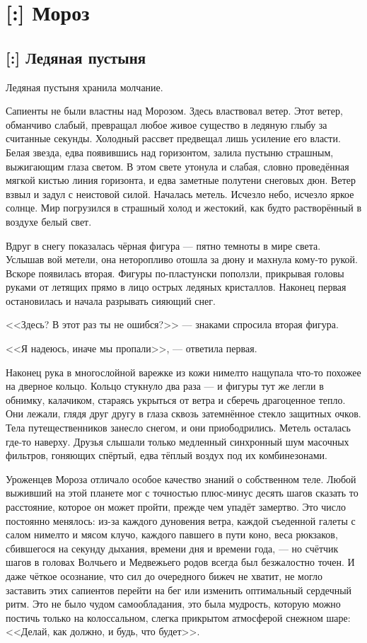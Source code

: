\chapter{[:] Мороз}

\section{[:] Ледяная пустыня}

Ледяная пустыня хранила молчание.

Сапиенты не были властны над Морозом.
Здесь властвовал ветер.
Этот ветер, обманчиво слабый, превращал любое живое существо в ледяную глыбу за считанные секунды.
Холодный рассвет предвещал лишь усиление его власти.
Белая звезда, едва появившись над горизонтом, залила пустыню страшным, выжигающим глаза светом.
В этом свете утонула и слабая, словно проведённая мягкой кистью линия горизонта, и едва заметные полутени снеговых дюн.
Ветер взвыл и задул с неистовой силой.
Началась метель.
Исчезло небо, исчезло яркое солнце.
Мир погрузился в страшный холод и жестокий, как будто растворённый в воздухе белый свет.

Вдруг в снегу показалась чёрная фигура --- пятно темноты в мире света.
Услышав вой метели, она неторопливо отошла за дюну и махнула кому-то рукой.
Вскоре появилась вторая.
Фигуры по-пластунски поползли, прикрывая головы руками от летящих прямо в лицо острых ледяных кристаллов.
Наконец первая остановилась и начала разрывать сияющий снег.

<<Здесь? В этот раз ты не ошибся?>> --- знаками спросила вторая фигура.

<<Я надеюсь, иначе мы пропали>>, --- ответила первая.

Наконец рука в многослойной варежке из кожи нимелто нащупала что-то похожее на дверное кольцо.
Кольцо стукнуло два раза --- и фигуры тут же легли в обнимку, калачиком, стараясь укрыться от ветра и сберечь драгоценное тепло.
Они лежали, глядя друг другу в глаза сквозь затемнённое стекло защитных очков.
Тела путещественников занесло снегом, и они приободрились.
Метель осталась где-то наверху.
Друзья слышали только медленный синхронный шум масочных фильтров, гоняющих спёртый, едва тёплый воздух под их комбинезонами.

Уроженцев Мороза отличало особое качество знаний о собственном теле.
Любой выживший на этой планете мог с точностью плюс-минус десять шагов сказать то расстояние, которое он может пройти, прежде чем упадёт замертво.
Это число постоянно менялось: из-за каждого дуновения ветра, каждой съеденной галеты с салом нимелто и мясом клучо, каждого павшего в пути коно, веса рюкзаков, сбившегося на секунду дыхания, времени дня и времени года, --- но счётчик шагов в головах Волчьего и Медвежьего родов всегда был безжалостно точен.
И даже чёткое осознание, что сил до очередного бижеч не хватит, не могло заставить этих сапиентов перейти на бег или изменить оптимальный сердечный ритм.
Это не было чудом самообладания, это была мудрость, которую можно постичь только на колоссальном, слегка прикрытом атмосферой снежном шаре: <<Делай, как должно, и будь, что будет>>.

